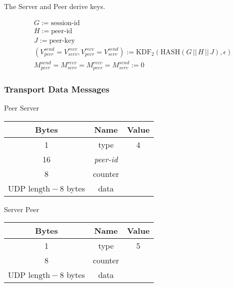 The Server and Peer derive keys.

\begin{align*}
    &  G:= \text{session-id}                                                               \\
    &  H := \text{peer-id}                                                                \\
    &  J := \text{peer-key}                                                              \\
    &  (V_{peer}^{send} = V_{serv}^{recv}, V_{peer}^{recv} = V_{serv}^{send}) := \text{KDF}_2(\text{HASH}(G\,
    ||\, H\,||\, J), \epsilon)                                        \\
    &   M_{peer}^{send} = M_{serv}^{recv} = M_{peer}^{recv} = M_{serv}^{send} := 0
\end{align*}

\subsubsection{Transport Data Messages}

\begin{center}
    Peer \textrightarrow Server\\
    \begin{tabular}{|c|c|c|}
        \hline
        \textbf{Bytes}                & \textbf{Name}  & \textbf{Value} \\
        \hline
        1                             & type           & 4              \\
        \hline
        16                            & \emph{peer-id} &                \\
        \hline
        8                             & counter        &                \\
        \hline
        $\text{UDP length} - 8$ bytes & data           &                \\
        \hline
    \end{tabular}
\end{center}

\begin{center}
    Server \textrightarrow Peer\\
    \begin{tabular}{|c|c|c|}
        \hline
        \textbf{Bytes}                & \textbf{Name} & \textbf{Value} \\
        \hline
        1                             & type          & 5              \\
        \hline
        8                             & counter       &                \\
        \hline
        $\text{UDP length} - 8$ bytes & data          &                \\
        \hline
    \end{tabular}
\end{center}


